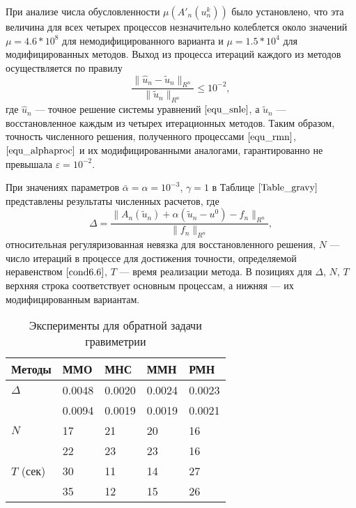 При анализе числа обусловленности $\mu(A'_n(u_n^k))$ было установлено, что эта величина для всех четырех процессов незначительно колеблется около значений $\mu=4.6 * 10^{8}$ для немодифицированного варианта и $\mu=1.5 * 10^{4}$ для модифицированных методов. Выход из процесса итераций каждого из методов осуществляется по правилу
\begin{equation}\label{cond6.6}
\frac{\|\hat{u}_n-\tilde{u}_n\|_{R^n}}{\|\tilde{u}_n\|_{R^n}}\le 10^{-2},
\end{equation}
где $\hat{u}_n$ --- точное решение системы уравнений $\eqref{equ_snle}$, а $\tilde{u}_n$ --- восстановленное каждым из четырех итерационных методов. Таким образом, точность численного решения, полученного процессами $\eqref{equ_rmn}$, $\eqref{equ_alphaproc}$ и их модифицированными аналогами, гарантированно не превышала $\varepsilon=10^{-2}$.

При значениях параметров $\bar\alpha=\alpha=10^{-3}$, $\gamma=1$ в Таблице $\ref{Table_gravy}$ представлены результаты численных расчетов, где
\begin{equation}\label{form6.7}
\Delta=\frac{\|A_n(\tilde{u}_n)+\alpha(\tilde{u}_n-u^0)-f_n\|_{R^n}}{\|f_n\|_{R^n}},
\end{equation}
относительная регуляризованная невязка для восстановленного решения, $N$ --- число итераций в процессе для достижения точности, определяемой неравенством $\eqref{cond6.6}$, $T$ --- время реализации метода. В позициях для $\Delta$, $N$, $T$ верхняя строка соответствует основным процессам, а нижняя --- их модифицированным вариантам.
\begin{table}[h]
	\centering
	\renewcommand{\arraystretch}{1.5}
	\caption{Эксперименты для обратной задачи гравиметрии}
	\label{Table_gravy}
	\begin{tabular}{|p{}|p{}|p{}|p{}|p{}|}
		\hline
		\rule{0cm}{0.5cm}
		\textbf{Методы} & \textbf{ММО} & \textbf{МНС} & \textbf{ММН} & \textbf{РМН} \\ \hline
		\rule{0cm}{0.5cm}
		{$\Delta$} & 0.0048 & 0.0020 & 0.0024 & 0.0023	 \\ \cline{2-5} 
		\rule{0cm}{0.5cm}
		&  0.0094   & 0.0019    &  0.0019   &  0.0021   \\ \hline
		\rule{0cm}{0.5cm}
		{$N$} & 17  &  21   &   20  &  16    \\ \cline{2-5}
		\rule{0cm}{0.5cm}
		&  22   &   23  &  23   &  16   \\ \hline
		\rule{0cm}{0.5cm}
		{$T$ (сек)}    &  30   &  11   &  14  & 27    \\ \cline{2-5}
		\rule{0cm}{0.5cm}
		& 35   & 12    &  15   &   26  \\ \hline
	\end{tabular}
\end{table}

